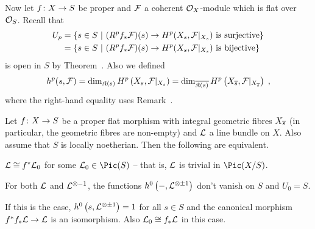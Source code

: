 \documentclass[a4paper,parskip=half,numbers=enddot, DIV=12]{scrreprt}
\begin{document}
Now let $f\colon X\morphism S$ be proper and $\mathcal{F}$ a coherent $\mathcal{O}_X$-module which is flat over $\mathcal{O}_S$. Recall that
\begin{align*}
	U_p&=\left\{s\in S\ \middle|\ (R^pf_*\mathcal{F})(s)\to H^p(X_s,\mathcal{F}|_{X_s})\text{ is surjective}\right\}\\
	&=\left\{s\in S\ \middle|\ (R^pf_*\mathcal{F})(s)\to H^p(X_s,\mathcal{F}|_{X_s})\text{ is bijective}\right\}
\end{align*}
is open in $S$ by Theorem~. Also we defined
\begin{align*}
	h^p(s,\mathcal{F})=\dim_{\mathfrak{K}(s)}H^p\left(X_s,\mathcal{F}|_{X_s}\right)=\dim_{\overline{\mathfrak{K}(s)}}H^p\left(X_{\overline{s}},\mathcal{F}|_{X_{\overline{s}}}\right)\;,
\end{align*}
where the right-hand equality uses Remark~.
\begin{prop}
	Let $f\colon X\morphism S$ be a proper flat morphism with integral geometric fibres $X_{\overline{s}}$ (in particular, the geometric fibres are non-empty) and $\mathcal{L}$ a line bundle on $X$. Also assume that $S$ is locally noetherian. Then the following are equivalent.
	\begin{alphanumerate}
		\item $\mathcal{L}\cong f^*\mathcal{L}_0$ for some $\Ll_0\in\Pic(S)$ -- that is, $\mathcal{L}$ is trivial in $\Pic(X/S)$.
		\item For both $\mathcal{L}$ and $\mathcal{L}^{\otimes -1}$, the functions $h^0\left(-,\mathcal{L}^{\otimes \pm 1}\right)$ don't vanish on $S$ and $U_0=S$.
	\end{alphanumerate}
	If this is the case, $h^0\left(s,\mathcal{L}^{\otimes\pm1}\right)=1$ for all $s\in S$ and the canonical morphism $f^*f_*\Ll\morphism\Ll$ is an isomorphism. Also $\mathcal{L}_0\cong f_*\mathcal{L}$ in this case.
\end{prop}
\end{document}
